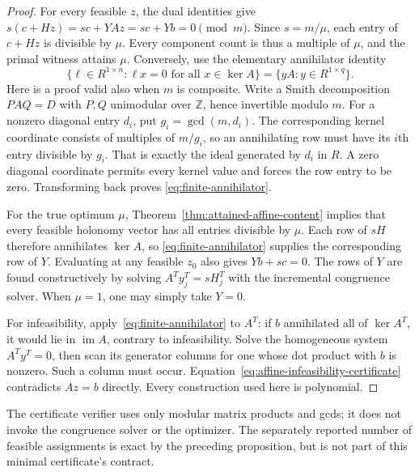 \begin{proof}
For every feasible $z$, the dual identities give
$s(c+Hz)=sc+YAz=sc+Yb=0\pmod m$.  Since $s=m/\mu$, each entry of
$c+Hz$ is divisible by $\mu$.  Every component count is thus a multiple
of $\mu$, and the primal witness attains $\mu$.  Conversely, use the
elementary annihilator identity
\begin{equation}
 \{\ell\in R^{1\times n}:\ell x=0\text{ for all }x\in\ker A\}
 =\{yA:y\in R^{1\times q}\}.
 \label{eq:finite-annihilator}
\end{equation}
Here is a proof valid also when $m$ is composite.  Write a Smith
decomposition $PAQ=D$ with $P,Q$ unimodular over $\mathbb Z$, hence
invertible modulo $m$.  For a nonzero diagonal entry $d_i$, put
$g_i=\gcd(m,d_i)$.  The corresponding kernel coordinate consists of
multiples of $m/g_i$, so an annihilating row must have its $i$th entry
divisible by $g_i$.  That is exactly the ideal generated by $d_i$ in
$R$.  A zero diagonal coordinate permits every kernel value and forces
the row entry to be zero.  Transforming back proves
\eqref{eq:finite-annihilator}.

For the true optimum $\mu$, Theorem~\ref{thm:attained-affine-content}
implies that every feasible holonomy vector has all entries divisible by
$\mu$.  Each row of $sH$ therefore annihilates $\ker A$, so
\eqref{eq:finite-annihilator} supplies the corresponding row of $Y$.
Evaluating at any feasible $z_0$ also gives $Yb+sc=0$.
The rows of $Y$ are found constructively by solving
$A^Ty_j^T=sH_j^T$ with the incremental congruence solver.  When $\mu=1$,
one may simply take $Y=0$.

For infeasibility, apply~\eqref{eq:finite-annihilator} to $A^T$:
if $b$ annihilated all of $\ker A^T$, it would lie in $\operatorname{im} A$,
contrary to infeasibility.  Solve the homogeneous system $A^Ty^T=0$,
then scan its generator columns for one whose dot product with $b$ is
nonzero.  Such a column must occur.  Equation~\eqref{eq:affine-infeasibility-certificate}
contradicts $Az=b$ directly.  Every construction used here is polynomial.
\end{proof}

The certificate verifier uses only modular matrix products and gcds; it
does not invoke the congruence solver or the optimizer.  The separately
reported number of feasible assignments is exact by the preceding
proposition, but is not part of this minimal certificate's contract.

